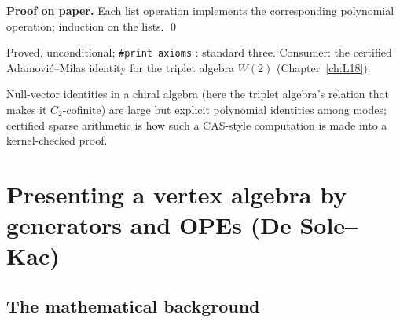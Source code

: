 \textbf{Proof on paper.} Each list operation implements the corresponding polynomial operation; induction on the
lists. \qed

\begin{status}
Proved, unconditional; \texttt{\#print axioms} \allowbreak{}\allowbreak{}\allowbreak{}: standard three. Consumer: the
certified Adamovi\'c--Milas identity for the triplet algebra $W(2)$ (Chapter~\ref{ch:L18}).
\end{status}

\begin{physics}
Null-vector identities in a chiral algebra (here the triplet algebra's relation that makes it $C_2$-cofinite) are
large but explicit polynomial identities among modes; certified sparse arithmetic is how such a CAS-style
computation is made into a kernel-checked proof.
\end{physics}


\section{Presenting a vertex algebra by generators and OPEs (De Sole--Kac)}\label{l11:sec:dsk}

\subsection{The mathematical background}

